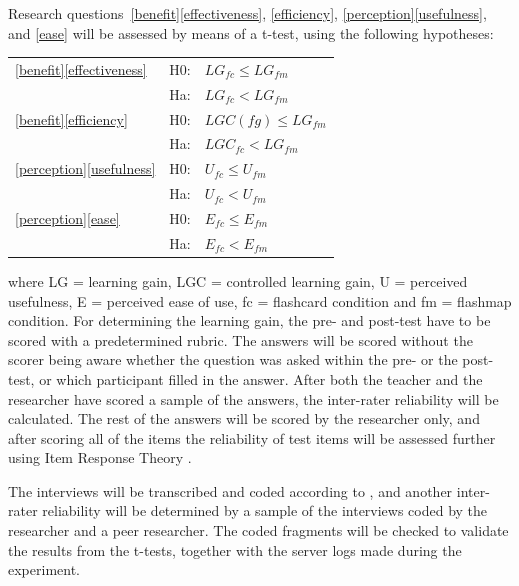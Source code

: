 
Research questions~\ref{benefit}\ref{effectiveness}, \ref{efficiency}, \ref{perception}\ref{usefulness}, and \ref{ease} will be assessed by means of a t-test, using the following hypotheses: 

\begin{tabular}{l l l}
\ref{benefit}\ref{effectiveness} & H0: & $LG_{fc} \leq LG_{fm}$ \\
                                 & Ha: & $LG_{fc} < LG_{fm}$ \\
\ref{benefit}\ref{efficiency}    & H0: & $LGC(fg) \leq LG_{fm}$ \\
                                 & Ha: & $ LGC_{fc} < LG_{fm}$ \\
\ref{perception}\ref{usefulness} & H0: & $U_{fc} \leq U_{fm}$ \\
                                 & Ha: & $U_{fc} < U_{fm}$ \\
\ref{perception}\ref{ease}       & H0: & $E_{fc} \leq E_{fm}$ \\
                                 & Ha: & $E_{fc} < E_{fm}$ \\
\end{tabular}

\noindent where LG = learning gain, LGC = controlled learning gain, U = perceived usefulness, E = perceived ease of use, fc = flashcard condition and fm = flashmap condition. For determining the learning gain, the pre- and post-test have to be scored with a predetermined rubric. The answers will be scored without the scorer being aware whether the question was asked within the pre- or the post-test, or which participant filled in the answer. After both the teacher and the researcher have scored a sample of the answers, the inter-rater reliability will be calculated. The rest of the answers will be scored by the researcher only, and after scoring all of the items the reliability of test items will be assessed further using Item Response Theory \cite{irt}.

The interviews will be transcribed and coded according to , and another inter-rater reliability will be determined by a sample of the interviews coded by the researcher and a peer researcher. The coded fragments will be checked to validate the results from the t-tests, together with the server logs made during the experiment.

